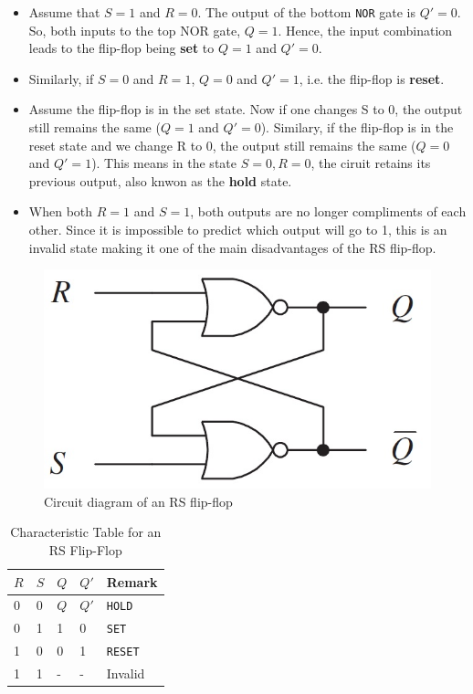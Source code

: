 \begin{itemize}
    \item Assume that $S=1$ and $R=0$. The output of the bottom \verb|NOR| gate is $Q'=0$. So, both inputs to the top NOR gate, $Q=1$. Hence, the input combination leads to the flip-flop being \textbf{set} to $Q=1$ and $Q'=0$.
    \item Similarly, if $S=0$ and $R=1$, $Q=0$ and $Q'=1$, i.e. the flip-flop is \textbf{reset}.
    \item Assume the flip-flop is in the set state. Now if one changes S to 0, the output still remains the same ($Q=1$ and $Q'=0$). Similary, if the flip-flop is in the reset state and we change R to 0, the output still remains the same ($Q=0$ and $Q'=1$). This means in the state $S=0, R=0$, the ciruit retains its previous output, also knwon as the \textbf{hold} state.
    \item When both $R=1$ and $S=1$, both outputs are no longer compliments of each other. Since it is impossible to predict which output will go to 1, this is an invalid state making it one of the main disadvantages of the RS flip-flop. 
\end{itemize}

\begin{figure}[H]
    \centering
    \includegraphics[width=0.50\columnwidth]{images/rs.jpg}
    \caption{Circuit diagram of an RS flip-flop}
    \label{1}
\end{figure}

\begin{table}[H]
    \centering
    \begin{tabularx}{0.75\columnwidth}{|Y|Y|Y|Y|Y|}\hline
        $R$ & $S$ & $Q$ & $Q'$ & Remark \\  & 0 & $Q$ & $Q'$ & \verb|HOLD| \\ 
        0 & 1 & 1 & 0 & \verb|SET| \\ 
        1 & 0 & 0 & 1 & \verb|RESET| \\ 
        1 & 1 & - & - & Invalid \\ \hline
    \end{tabularx}
    \caption{Characteristic Table for an RS Flip-Flop}
\end{table}

